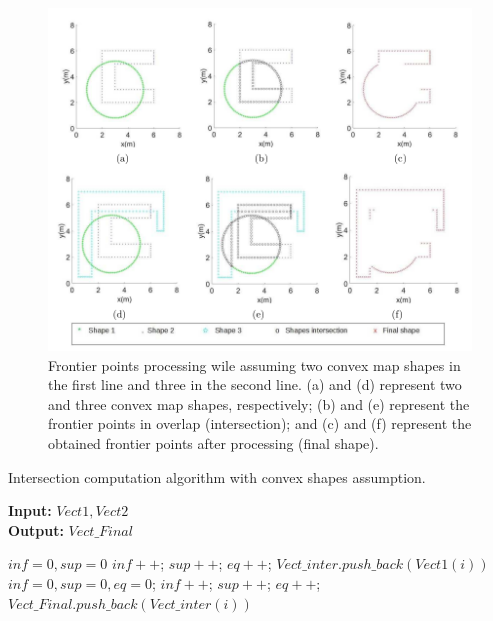 \documentclass[11pt,openany]{book}
\begin{document}
\begin{figure}[H]
    \centering
    \includegraphics[scale=0.4]{assets/3_6.png}
    \caption{Frontier points processing wile assuming two convex map shapes in the ﬁrst line and three in the second line. (a) and (d) represent two and three convex map shapes, respectively; (b) and (e) represent the frontier points in overlap (intersection); and (c) and (f) represent the obtained frontier points after processing (ﬁnal shape).}
    \label{fig:3.6}
\end{figure}
\begin{algorithm}[H]
    \caption{Intersection computation algorithm with convex shapes assumption.}
    \label{alg:3.4}
    \hspace*{\algorithmicindent} \textbf{Input:} $Vect1, Vect2$ \\
    \hspace*{\algorithmicindent} \textbf{Output:} $Vect\_Final$
    \begin{algorithmic}[1]
        \STATE $inf = 0, sup = 0$
        \STATE $inf++$;
        \STATE $sup++$;
        \ELSE
        \STATE $eq++$;
        \ENDIF
        \ENDFOR
        \STATE $Vect\_inter.push\_back(Vect1(i))$
        \ENDIF
        \ENDFOR
        \STATE $inf=0,sup=0, eq=0$;
        \STATE $inf++$;
        \STATE $sup++$;
        \ELSE
        \STATE $eq++$;
        \ENDIF
        \ENDIF
        \ENDFOR
        \STATE $Vect\_Final.push\_back(Vect\_inter(i))$
        \ENDIF
        \ENDFOR
    \end{algorithmic}
\end{algorithm}
\end{document}
